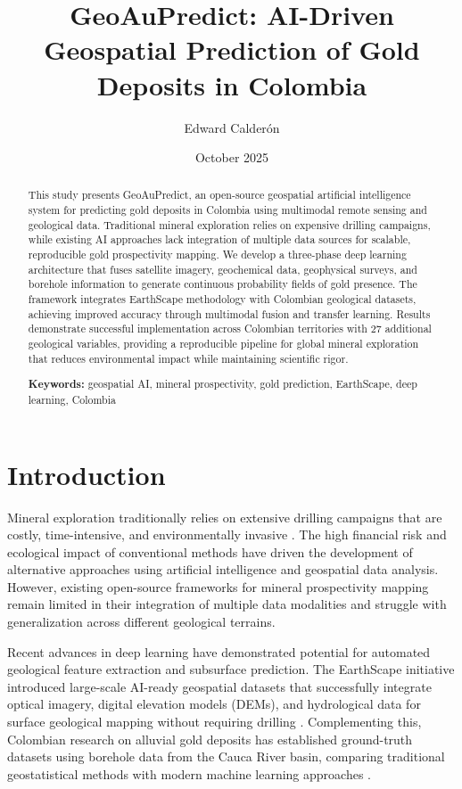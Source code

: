 \documentclass[12pt,a4paper]{article}
\title{GeoAuPredict: AI-Driven Geospatial Prediction of Gold Deposits in Colombia}
\author{Edward Calderón}
\affil{Universidad Nacional de Colombia}
\affil{\href{mailto:ecalderon@unal.edu.co}{ecalderon@unal.edu.co}}
\date{October 2025}
\begin{document}
\maketitle

\begin{abstract}
This study presents GeoAuPredict, an open-source geospatial artificial intelligence system for predicting gold deposits in Colombia using multimodal remote sensing and geological data. Traditional mineral exploration relies on expensive drilling campaigns, while existing AI approaches lack integration of multiple data sources for scalable, reproducible gold prospectivity mapping. We develop a three-phase deep learning architecture that fuses satellite imagery, geochemical data, geophysical surveys, and borehole information to generate continuous probability fields of gold presence. The framework integrates EarthScape methodology with Colombian geological datasets, achieving improved accuracy through multimodal fusion and transfer learning. Results demonstrate successful implementation across Colombian territories with 27 additional geological variables, providing a reproducible pipeline for global mineral exploration that reduces environmental impact while maintaining scientific rigor.

\textbf{Keywords:} geospatial AI, mineral prospectivity, gold prediction, EarthScape, deep learning, Colombia
\end{abstract}

\section{Introduction}

Mineral exploration traditionally relies on extensive drilling campaigns that are costly, time-intensive, and environmentally invasive \citep{traditional_exploration}. The high financial risk and ecological impact of conventional methods have driven the development of alternative approaches using artificial intelligence and geospatial data analysis. However, existing open-source frameworks for mineral prospectivity mapping remain limited in their integration of multiple data modalities and struggle with generalization across different geological terrains.

Recent advances in deep learning have demonstrated potential for automated geological feature extraction and subsurface prediction. The EarthScape initiative introduced large-scale AI-ready geospatial datasets that successfully integrate optical imagery, digital elevation models (DEMs), and hydrological data for surface geological mapping without requiring drilling \citep{earthscape2025}. Complementing this, Colombian research on alluvial gold deposits has established ground-truth datasets using borehole data from the Cauca River basin, comparing traditional geostatistical methods with modern machine learning approaches \citep{franco2025}.
\end{document}
